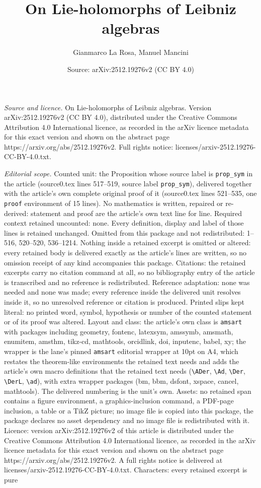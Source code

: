 \documentclass[10pt,a4paper]{amsart}
\title[On Lie-holomorphs of Leibniz algebras]{On Lie-holomorphs of Leibniz algebras}
\author{Gianmarco La Rosa, Manuel Mancini}
\date{Source: arXiv:2512.19276v2 (CC BY 4.0)}
\begin{document}
\maketitle

\noindent\emph{Source and licence.} On Lie-holomorphs of Leibniz algebras. Version arXiv:2512.19276v2 (CC BY 4.0), distributed under the Creative Commons Attribution 4.0 International licence, as recorded in the arXiv licence metadata for this exact version and shown on the abstract page https://arxiv.org/abs/2512.19276v2. Full rights notice: licenses/arxiv-2512.19276-CC-BY-4.0.txt.\par\smallskip

\noindent\textit{Editorial scope.} Counted unit: the Proposition whose source label is \texttt{prop\_sym} in the article (source0.tex lines 517--519, source label \texttt{prop\_sym}), delivered together with the article's own complete original proof of it (source0.tex lines 521--535, one \texttt{proof} environment of 15 lines). No mathematics is written, repaired or re-derived: statement and proof are the article's own text line for line. Required context retained uncounted: none. Every definition, display and label of those lines is retained unchanged. Omitted from this package and not redistributed: 1--516, 520--520, 536--1214. Nothing inside a retained excerpt is omitted or altered: every retained body is delivered exactly as the article's lines are written, so no omission receipt of any kind accompanies this package. Citations: the retained excerpts carry no citation command at all, so no bibliography entry of the article is transcribed and no reference is redistributed. Reference adaptation: none was needed and none was made; every reference inside the delivered unit resolves inside it, so no unresolved reference or citation is produced. Printed slips kept literal: no printed word, symbol, hypothesis or number of the counted statement or of its proof was altered. Layout and class: the article's own class is \texttt{amsart} with packages including geometry, fontenc, latexsym, amssymb, amsmath, enumitem, amsthm, tikz-cd, mathtools, orcidlink, doi, inputenc, babel, xy; the wrapper is the lane's pinned \texttt{amsart} editorial wrapper at 10pt on A4, which restates the theorem-like environments the retained text needs and adds the article's own macro definitions that the retained text needs (\texttt{\textbackslash ADer}, \texttt{\textbackslash Ad}, \texttt{\textbackslash Der}, \texttt{\textbackslash DerL}, \texttt{\textbackslash ad}), with extra wrapper packages (bm, bbm, dsfont, xspace, cancel, mathtools). The delivered numbering is the unit's own. Assets: no retained span contains a figure environment, a graphics-inclusion command, a PDF-page inclusion, a table or a TikZ picture; no image file is copied into this package, the package declares no asset dependency and no image file is redistributed with it. Licence: version arXiv:2512.19276v2 of this article is distributed under the Creative Commons Attribution 4.0 International licence, as recorded in the arXiv licence metadata for this exact version and shown on the abstract page https://arxiv.org/abs/2512.19276v2. A full rights notice is delivered at licenses/arxiv-2512.19276-CC-BY-4.0.txt. Characters: every retained excerpt is pure 
\end{document}
